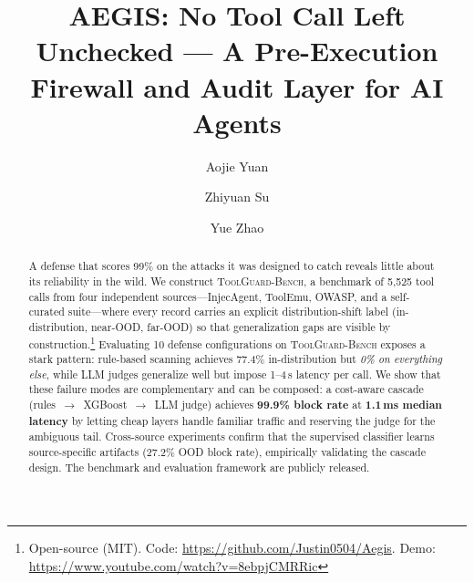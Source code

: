 \documentclass[sigconf]{acmart}
\newcommand{\bench}{\textsc{ToolGuard-Bench}\xspace}
\begin{document}

\title{AEGIS: No Tool Call Left Unchecked --- A Pre-Execution Firewall and Audit Layer for AI Agents}

\author{Aojie Yuan}

\author{Zhiyuan Su}

\author{Yue Zhao}

\begin{abstract}
A defense that scores 99\% on the attacks it was designed to catch reveals little about its reliability in the wild.
We construct \bench, a benchmark of 5{,}525 tool calls from four independent sources---InjecAgent, ToolEmu, OWASP, and a self-curated suite---where every record carries an explicit distribution-shift label (in-distribution, near-OOD, far-OOD) so that generalization gaps are visible by construction.\footnote{Open-source (MIT). Code: \url{https://github.com/Justin0504/Aegis}. Demo: \url{https://www.youtube.com/watch?v=8ebpjCMRRic}}
Evaluating 10 defense configurations on \bench exposes a stark pattern: rule-based scanning achieves 77.4\% in-distribution but \emph{0\% on everything else}, while LLM judges generalize well but impose 1--4\,s latency per call.
We show that these failure modes are complementary and can be composed: a cost-aware cascade (rules~$\to$~XGBoost~$\to$~LLM judge) achieves \textbf{99.9\% block rate} at \textbf{1.1\,ms median latency} by letting cheap layers handle familiar traffic and reserving the judge for the ambiguous tail.
Cross-source experiments confirm that the supervised classifier learns source-specific artifacts (27.2\% OOD block rate), empirically validating the cascade design.
The benchmark and evaluation framework are publicly released.
\end{abstract}


\maketitle
\end{document}
